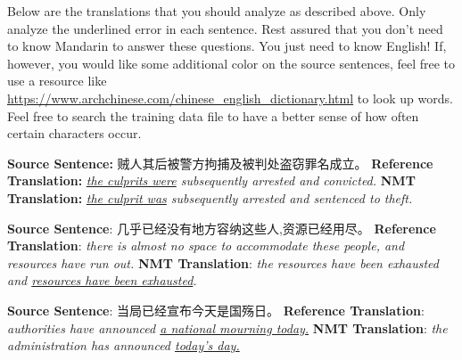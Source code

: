 \begin{parts}
    Below are the translations that you should analyze as described above. Only analyze the underlined error in each sentence. Rest assured that you don't need to know Mandarin to answer these questions. You just need to know English! If, however, you would like some additional color on the source sentences, feel free to use a resource like \url{https://www.archchinese.com/chinese_english_dictionary.html} to look up words. Feel free to search the training data file to have a better sense of how often certain characters occur.

    \begin{subparts}
        \subpart[2]
        \textbf{Source Sentence:} 贼人其后被警方拘捕及被判处盗窃罪名成立。 \newline
        \textbf{Reference Translation:} \textit{\underline{the culprits were} subsequently arrested and convicted.}\newline
        \textbf{NMT Translation:} \textit{\underline{the culprit was} subsequently arrested and sentenced to theft.}

        \subpart[2]
        \textbf{Source Sentence}: 几乎已经没有地方容纳这些人,资源已经用尽。\newline
        \textbf{Reference Translation}: \textit{there is almost no space to accommodate these people, and resources have run out.   }\newline
        \textbf{NMT Translation}: \textit{the resources have been exhausted and \underline{resources have been exhausted}.}

        \subpart[2]
        \textbf{Source Sentence}: 当局已经宣布今天是国殇日。 \newline
        \textbf{Reference Translation}: \textit{authorities have announced \underline{a national mourning today.}}\newline
        \textbf{NMT Translation}: \textit{the administration has announced \underline{today's day.}}
        

\end{subparts}
\end{parts}
